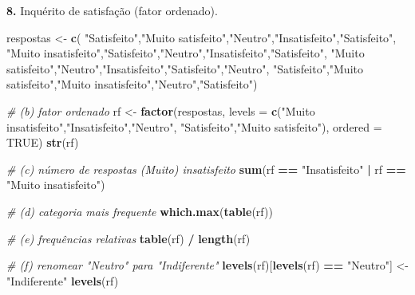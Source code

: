 \documentclass[
  portuguese,
  11pt,
  openany]{book}
\newenvironment{Shaded}{\begin{snugshade}}{\end{snugshade}}
\newcommand{\AttributeTok}[1]{\textcolor[rgb]{0.13,0.29,0.53}{#1}}
\newcommand{\CommentTok}[1]{\textcolor[rgb]{0.56,0.35,0.01}{\textit{#1}}}
\newcommand{\ConstantTok}[1]{\textcolor[rgb]{0.56,0.35,0.01}{#1}}
\newcommand{\FunctionTok}[1]{\textcolor[rgb]{0.13,0.29,0.53}{\textbf{#1}}}
\newcommand{\NormalTok}[1]{#1}
\newcommand{\OtherTok}[1]{\textcolor[rgb]{0.56,0.35,0.01}{#1}}
\newcommand{\SpecialCharTok}[1]{\textcolor[rgb]{0.81,0.36,0.00}{\textbf{#1}}}
\newcommand{\StringTok}[1]{\textcolor[rgb]{0.31,0.60,0.02}{#1}}
\begin{document}
\textbf{8.} Inquérito de satisfação (fator ordenado).

\begin{Shaded}
\begin{Highlighting}[]
\NormalTok{respostas }\OtherTok{\textless{}{-}} \FunctionTok{c}\NormalTok{(}
  \StringTok{"Satisfeito"}\NormalTok{,}\StringTok{"Muito satisfeito"}\NormalTok{,}\StringTok{"Neutro"}\NormalTok{,}\StringTok{"Insatisfeito"}\NormalTok{,}\StringTok{"Satisfeito"}\NormalTok{,}
  \StringTok{"Muito insatisfeito"}\NormalTok{,}\StringTok{"Satisfeito"}\NormalTok{,}\StringTok{"Neutro"}\NormalTok{,}\StringTok{"Insatisfeito"}\NormalTok{,}\StringTok{"Satisfeito"}\NormalTok{,}
  \StringTok{"Muito satisfeito"}\NormalTok{,}\StringTok{"Neutro"}\NormalTok{,}\StringTok{"Insatisfeito"}\NormalTok{,}\StringTok{"Satisfeito"}\NormalTok{,}\StringTok{"Neutro"}\NormalTok{,}
  \StringTok{"Satisfeito"}\NormalTok{,}\StringTok{"Muito satisfeito"}\NormalTok{,}\StringTok{"Muito insatisfeito"}\NormalTok{,}\StringTok{"Neutro"}\NormalTok{,}\StringTok{"Satisfeito"}\NormalTok{)}

\CommentTok{\# (b) fator ordenado}
\NormalTok{rf }\OtherTok{\textless{}{-}} \FunctionTok{factor}\NormalTok{(respostas,}
  \AttributeTok{levels =} \FunctionTok{c}\NormalTok{(}\StringTok{"Muito insatisfeito"}\NormalTok{,}\StringTok{"Insatisfeito"}\NormalTok{,}\StringTok{"Neutro"}\NormalTok{,}
             \StringTok{"Satisfeito"}\NormalTok{,}\StringTok{"Muito satisfeito"}\NormalTok{),}
  \AttributeTok{ordered =} \ConstantTok{TRUE}\NormalTok{)}
\FunctionTok{str}\NormalTok{(rf)}

\CommentTok{\# (c) número de respostas (Muito) insatisfeito}
\FunctionTok{sum}\NormalTok{(rf }\SpecialCharTok{==} \StringTok{"Insatisfeito"} \SpecialCharTok{|}\NormalTok{ rf }\SpecialCharTok{==} \StringTok{"Muito insatisfeito"}\NormalTok{)}

\CommentTok{\# (d) categoria mais frequente}
\FunctionTok{which.max}\NormalTok{(}\FunctionTok{table}\NormalTok{(rf))}

\CommentTok{\# (e) frequências relativas}
\FunctionTok{table}\NormalTok{(rf) }\SpecialCharTok{/} \FunctionTok{length}\NormalTok{(rf)}

\CommentTok{\# (f) renomear "Neutro" para "Indiferente"}
\FunctionTok{levels}\NormalTok{(rf)[}\FunctionTok{levels}\NormalTok{(rf) }\SpecialCharTok{==} \StringTok{"Neutro"}\NormalTok{] }\OtherTok{\textless{}{-}} \StringTok{"Indiferente"}
\FunctionTok{levels}\NormalTok{(rf)}
\end{Highlighting}
\end{Shaded}
\end{document}
